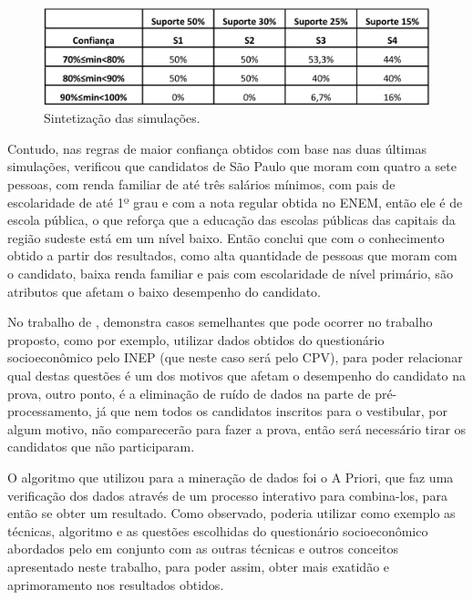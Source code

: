 \begin{figure}[!htp]
	\begin{center}
    \caption{\label{fig:waveform_fig} Sintetização das simulações.}
	\includegraphics[scale=0.49]{Figuras/Sintetizacao_simulacoes.png}
	\end{center}
\end{figure}

\par
Contudo, nas regras de maior confiança obtidos com base nas duas últimas simulações,  verificou que candidatos de São Paulo que moram com quatro a sete pessoas, com renda familiar de até três salários mínimos, com pais de escolaridade de até 1º grau e com a nota regular obtida no ENEM, então ele é de escola pública, o que reforça que a educação das escolas públicas das capitais da região sudeste está em um nível baixo. Então  conclui que com o conhecimento obtido a partir dos resultados, como alta quantidade de pessoas que moram com o candidato, baixa renda familiar e pais com escolaridade de nível primário, são atributos que afetam o baixo desempenho do candidato. 

No trabalho de , demonstra casos semelhantes que pode ocorrer no trabalho proposto, como por exemplo, utilizar dados obtidos do questionário socioeconômico pelo INEP (que neste caso será pelo CPV), para poder relacionar qual destas questões é um dos motivos que afetam o desempenho do candidato na prova, outro ponto, é a eliminação de ruído de dados na parte de pré-processamento, já que nem todos os candidatos inscritos para o vestibular, por algum motivo, não comparecerão para fazer a prova, então será necessário tirar os candidatos que não participaram.

\par
O algoritmo que  utilizou para a mineração de dados foi o A Priori, que faz uma verificação dos dados através de um processo interativo para combina-los, para então se obter um resultado. Como observado, poderia utilizar como exemplo as técnicas, algoritmo e as questões escolhidas do questionário socioeconômico abordados pelo  em conjunto com as outras técnicas e outros conceitos apresentado neste trabalho, para poder assim, obter mais exatidão e aprimoramento nos resultados obtidos.

